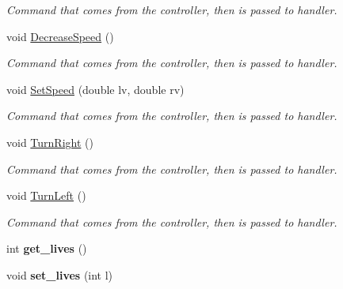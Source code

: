 \begin{DoxyCompactItemize}
\begin{DoxyCompactList}\small\item\em Command that comes from the controller, then is passed to handler. \end{DoxyCompactList}\item 
void \hyperlink{classRobot_a94afa6f63eb22667261c07933faae481}{Decrease\+Speed} ()\hypertarget{classRobot_a94afa6f63eb22667261c07933faae481}{}\label{classRobot_a94afa6f63eb22667261c07933faae481}

\begin{DoxyCompactList}\small\item\em Command that comes from the controller, then is passed to handler. \end{DoxyCompactList}\item 
void \hyperlink{classRobot_ae73c71944d406aaf95b9a2d5117e13e9}{Set\+Speed} (double lv, double rv)\hypertarget{classRobot_ae73c71944d406aaf95b9a2d5117e13e9}{}\label{classRobot_ae73c71944d406aaf95b9a2d5117e13e9}

\begin{DoxyCompactList}\small\item\em Command that comes from the controller, then is passed to handler. \end{DoxyCompactList}\item 
void \hyperlink{classRobot_a12b5883779f682c66e71bc54b6539694}{Turn\+Right} ()\hypertarget{classRobot_a12b5883779f682c66e71bc54b6539694}{}\label{classRobot_a12b5883779f682c66e71bc54b6539694}

\begin{DoxyCompactList}\small\item\em Command that comes from the controller, then is passed to handler. \end{DoxyCompactList}\item 
void \hyperlink{classRobot_ad864d21d997dbadf55f997c2f0143d41}{Turn\+Left} ()\hypertarget{classRobot_ad864d21d997dbadf55f997c2f0143d41}{}\label{classRobot_ad864d21d997dbadf55f997c2f0143d41}

\begin{DoxyCompactList}\small\item\em Command that comes from the controller, then is passed to handler. \end{DoxyCompactList}\item 
int {\bfseries get\+\_\+lives} ()\hypertarget{classRobot_af98883de1b592153ba461c8f89ca993c}{}\label{classRobot_af98883de1b592153ba461c8f89ca993c}

\item 
void {\bfseries set\+\_\+lives} (int l)\hypertarget{classRobot_a8823c73b258afe8cf8ef276e8f2f9aab}{}\label{classRobot_a8823c73b258afe8cf8ef276e8f2f9aab}


\end{DoxyCompactItemize}
